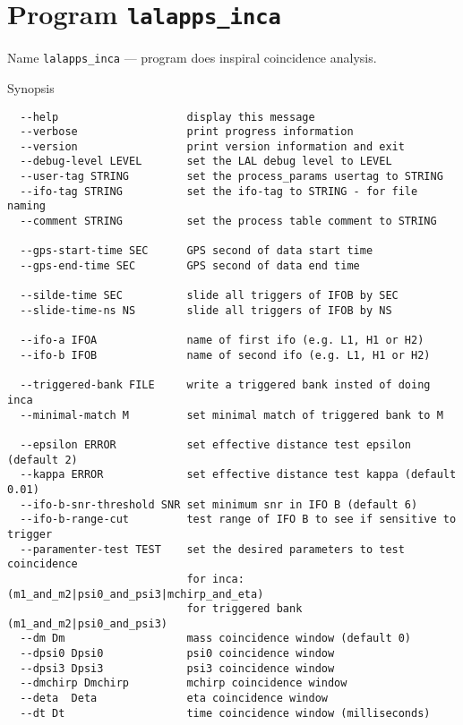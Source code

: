 \section{Program \texttt{lalapps\_inca}}
\label{program:lalapps-inca}

\begin{entry}
\item[Name]
\verb$lalapps_inca$ --- program does inspiral coincidence analysis.

\item[Synopsis]
\begin{verbatim}
  --help                    display this message
  --verbose                 print progress information
  --version                 print version information and exit
  --debug-level LEVEL       set the LAL debug level to LEVEL
  --user-tag STRING         set the process_params usertag to STRING
  --ifo-tag STRING          set the ifo-tag to STRING - for file naming
  --comment STRING          set the process table comment to STRING
 
  --gps-start-time SEC      GPS second of data start time
  --gps-end-time SEC        GPS second of data end time
 
  --silde-time SEC          slide all triggers of IFOB by SEC
  --slide-time-ns NS        slide all triggers of IFOB by NS
 
  --ifo-a IFOA              name of first ifo (e.g. L1, H1 or H2)
  --ifo-b IFOB              name of second ifo (e.g. L1, H1 or H2)
 
  --triggered-bank FILE     write a triggered bank insted of doing inca
  --minimal-match M         set minimal match of triggered bank to M
 
  --epsilon ERROR           set effective distance test epsilon (default 2)
  --kappa ERROR             set effective distance test kappa (default 0.01)
  --ifo-b-snr-threshold SNR set minimum snr in IFO B (default 6)
  --ifo-b-range-cut         test range of IFO B to see if sensitive to trigger
  --paramenter-test TEST    set the desired parameters to test coincidence
                            for inca: (m1_and_m2|psi0_and_psi3|mchirp_and_eta)
                            for triggered bank (m1_and_m2|psi0_and_psi3)
  --dm Dm                   mass coincidence window (default 0)
  --dpsi0 Dpsi0             psi0 coincidence window
  --dpsi3 Dpsi3             psi3 coincidence window
  --dmchirp Dmchirp         mchirp coincidence window
  --deta  Deta              eta coincidence window
  --dt Dt                   time coincidence window (milliseconds)
 

\end{verbatim}
\end{entry}
